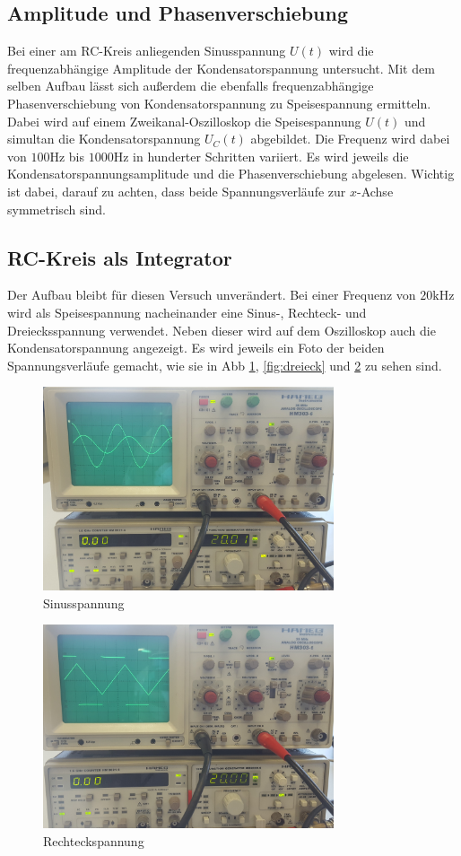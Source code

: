 \subsection{Amplitude und Phasenverschiebung}
Bei einer am RC-Kreis anliegenden Sinusspannung $U(t)$ wird die frequenzabhängige Amplitude der Kondensatorspannung untersucht.
Mit dem selben Aufbau lässt sich außerdem die ebenfalls frequenzabhängige
Phasenverschiebung von Kondensatorspannung zu Speisespannung ermitteln.
Dabei wird auf einem Zweikanal-Oszilloskop die Speisespannung $U(t)$ und simultan die Kondensatorspannung $U_C (t)$ abgebildet.
Die Frequenz wird dabei von $100\si{\hertz}$ bis $1000\si{\hertz}$ in hunderter Schritten variiert. Es wird jeweils die 
Kondensatorspannungsamplitude und die Phasenverschiebung abgelesen. Wichtig ist dabei, darauf zu achten, dass beide Spannungsverläufe
zur $x$-Achse symmetrisch sind. 

\subsection{RC-Kreis als Integrator}
Der Aufbau bleibt für diesen Versuch unverändert.
Bei einer Frequenz von $20\si{\kilo\hertz}$ wird als Speisespannung nacheinander eine Sinus-, Rechteck- und Dreiecksspannung
verwendet. Neben dieser wird auf dem Oszilloskop auch die Kondensatorspannung angezeigt. Es wird jeweils ein Foto der beiden 
Spannungsverläufe gemacht, wie sie in Abb \ref{fig:sinus}, \ref{fig:dreieck} und \ref{fig:rechteck} zu sehen sind. 

\begin{figure}
    \centering
    \includegraphics[height=6cm]{data/d_sinus}
    \caption{Sinusspannung}
    \label{fig:sinus}
\end{figure}

\begin{figure}
    \centering
    \includegraphics[height=6cm]{data/d_rechteck}
    \caption{Rechteckspannung}
    \label{fig:rechteck}
\end{figure}

